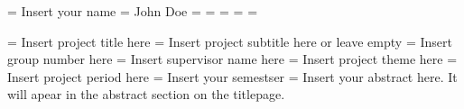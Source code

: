 



\groupMemberOne   = {Insert your name} %
\groupMemberTwo   = {John Doe} %
\groupMemberThree = {} %
\groupMemberFour  = {} %
\groupMemberFive  = {} %
\groupMemberSix   = {} %
\groupMemberSeven = {} %

\projectTitle     = {Insert project title here}
\projectSubtitle  = {Insert project subtitle here or leave empty}
\groupNumber      = {Insert group number here} %
\supervisor       = {Insert supervisor name here} %
\projectTheme     = {Insert project theme here} %
\projectPeriod    = {Insert project period here} %
\semester         = {Insert your semestser} %
\projectAbstract  = {
    Insert your abstract here.
    It will apear in the abstract section on the titlepage.
} %


\setlength{\marginparwidth}{2cm} %





\pagestyle{empty}     %


